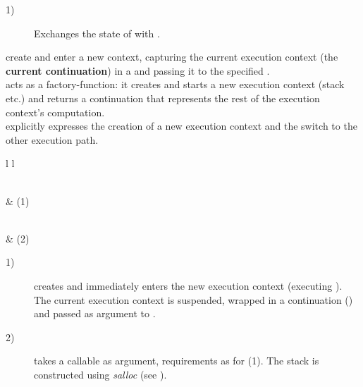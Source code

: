 \begin{description}
    \item[1)] Exchanges the state of  with .\\
\end{description}




create and enter a new context, capturing the current execution context (the
{\bfseries current continuation}) in a \cont and passing it to the
specified \entryfn.\\
\callcc acts as a factory-function: it creates and starts a new execution context
(stack etc.) and returns a continuation that represents the rest of the execution
context's computation.\\
\callcc explicitly expresses the creation of a new execution
context and the switch to the other execution path.\\

\begin{tabular}{ l l }
    \midrule

    \\
     & (1)\\

    \midrule

    \\
     & (2)\\

    \midrule
\end{tabular}

\begin{description}
    \item[1)] creates and immediately enters the new execution context
              (executing ). The current execution context is suspended,
              wrapped in a continuation (\cont) and passed as argument to
              .
    \item[2)] takes a callable as argument, requirements as for (1). The stack
              is constructed using \emph{salloc}
              (see ).
\end{description}

